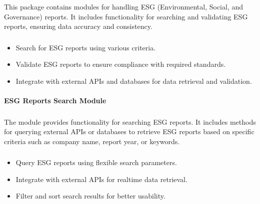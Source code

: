 \documentclass[letterpaper,10pt,english]{sphinxmanual}
\begin{document}
\sphinxAtStartPar
This package contains modules for handling ESG (Environmental, Social, and Governance) reports. It includes functionality for searching and validating ESG reports, ensuring data accuracy and consistency.
\subsubsection*{}
\begin{itemize}
\item {} 
\sphinxAtStartPar
Search for ESG reports using various criteria.

\item {} 
\sphinxAtStartPar
Validate ESG reports to ensure compliance with required standards.

\item {} 
\sphinxAtStartPar
Integrate with external APIs and databases for data retrieval and validation.

\end{itemize}


\paragraph{ESG Reports Search Module}
\label{\detokenize{src.esg_reports:module-src.esg_reports.search}}\label{\detokenize{src.esg_reports:esg-reports-search-module}}\subsubsection*{}

\sphinxAtStartPar
The  module provides functionality for searching ESG reports. It includes methods for querying external APIs or databases to retrieve ESG reports based on specific criteria such as company name, report year, or keywords.
\subsubsection*{}
\begin{itemize}
\item {} 
\sphinxAtStartPar
Query ESG reports using flexible search parameters.

\item {} 
\sphinxAtStartPar
Integrate with external APIs for real\sphinxhyphen{}time data retrieval.

\item {} 
\sphinxAtStartPar
Filter and sort search results for better usability.

\end{itemize}
\end{document}

